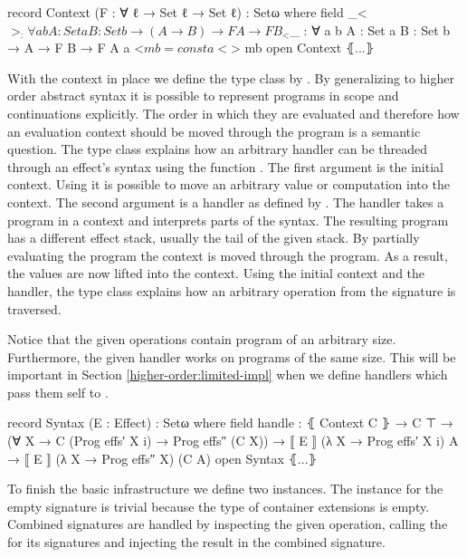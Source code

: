\begin{code}
record Context (F : ∀ {ℓ} → Set ℓ → Set ℓ) : Setω where
  field _<$>_ : ∀ {a b} {A : Set a} {B : Set b} → (A → B) → F A → F B
  _<$_ : ∀ {a b} {A : Set a} {B : Set b} → A → F B → F A
  a <$ mb = const a <$> mb
open Context ⦃...⦄
\end{code}
With the context in place we define the  type class by
\citeauthor{DBLP:conf/haskell/WuSH14}.
By generalizing to higher order abstract syntax it is possible to represent
programs in scope and continuations explicitly.
The order in which they are evaluated and therefore how an evaluation context
should be moved through the program is a semantic question.
The type class explains how an arbitrary handler can be threaded through an
effect's syntax using the function .
The first argument is the initial context.
Using \AgdaFunction{<\$} it is possible to move an arbitrary value or
computation into the context.
The second argument is a handler as defined by
\citeauthor{DBLP:conf/haskell/WuSH14}.
The handler takes a program in a context and interprets parts of the syntax.
The resulting program has a different effect stack, usually the tail of the
given stack.
By partially evaluating the program the context is moved through the
program.
As a result, the values are now lifted into the context.
Using the initial context and the handler, the type class explains how an
arbitrary operation from the signature  is traversed.

Notice that the given operations contain program of an arbitrary size.
Furthermore, the given handler works on programs of the same size.
This will be important in Section \ref{higher-order:limited-impl} when we define
handlers which pass them self to .

\begin{code}
record Syntax (E : Effect) : Setω where
  field handle : ⦃ Context C ⦄ → C ⊤ →
          (∀ {X} → C (Prog effs′ X {i}) → Prog effs″ (C X)) →
          ⟦ E ⟧ (λ X → Prog effs′ X {i}) A → ⟦ E ⟧ (λ X → Prog effs″ X) (C A)
open Syntax ⦃...⦄
\end{code}
To finish the basic infrastructure we define two 
instances.
The instance for the empty signature  is trivial because the
type of container extensions is empty.
Combined signatures are handled by inspecting the given operation, calling the
 for its signatures and injecting the result in the
combined signature.

